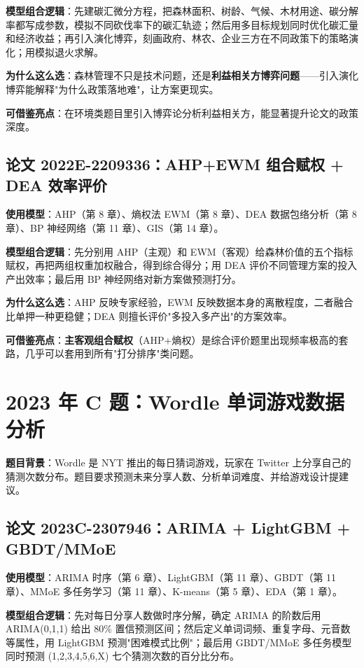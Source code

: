 \textbf{模型组合逻辑}：先建碳汇微分方程，把森林面积、树龄、气候、木材用途、碳分解率都写成参数，模拟不同砍伐率下的碳汇轨迹；然后用多目标规划同时优化碳汇量和经济收益；再引入演化博弈，刻画政府、林农、企业三方在不同政策下的策略演化；用模拟退火求解。

\textbf{为什么这么选}：森林管理不只是技术问题，还是\textbf{利益相关方博弈问题}——引入演化博弈能解释"为什么政策落地难"，让方案更现实。

\textbf{可借鉴亮点}：在环境类题目里引入博弈论分析利益相关方，能显著提升论文的政策深度。

\subsection{论文 2022E-2209336：AHP+EWM 组合赋权 + DEA 效率评价}
\textbf{使用模型}：AHP（第 8 章）、熵权法 EWM（第 8 章）、DEA 数据包络分析（第 8 章）、BP 神经网络（第 11 章）、GIS（第 14 章）。

\textbf{模型组合逻辑}：先分别用 AHP（主观）和 EWM（客观）给森林价值的五个指标赋权，再把两组权重加权融合，得到综合得分；用 DEA 评价不同管理方案的投入产出效率；最后用 BP 神经网络对新方案做预测打分。

\textbf{为什么这么选}：AHP 反映专家经验，EWM 反映数据本身的离散程度，二者融合比单押一种更稳健；DEA 则擅长评价"多投入多产出"的方案效率。

\textbf{可借鉴亮点}：\textbf{主客观组合赋权}（AHP+熵权）是综合评价题里出现频率极高的套路，几乎可以套用到所有"打分排序"类问题。

\section{2023 年 C 题：Wordle 单词游戏数据分析}

\textbf{题目背景}：Wordle 是 NYT 推出的每日猜词游戏，玩家在 Twitter 上分享自己的猜测次数分布。题目要求预测未来分享人数、分析单词难度、并给游戏设计提建议。

\subsection{论文 2023C-2307946：ARIMA + LightGBM + GBDT/MMoE}
\textbf{使用模型}：ARIMA 时序（第 6 章）、LightGBM（第 11 章）、GBDT（第 11 章）、MMoE 多任务学习（第 11 章）、K-means（第 5 章）、EDA（第 1 章）。

\textbf{模型组合逻辑}：先对每日分享人数做时序分解，确定 ARIMA 的阶数后用 ARIMA(0,1,1) 给出 80\% 置信预测区间；然后定义单词词频、重复字母、元音数等属性，用 LightGBM 预测"困难模式比例"；最后用 GBDT/MMoE 多任务模型同时预测 (1,2,3,4,5,6,X) 七个猜测次数的百分比分布。

